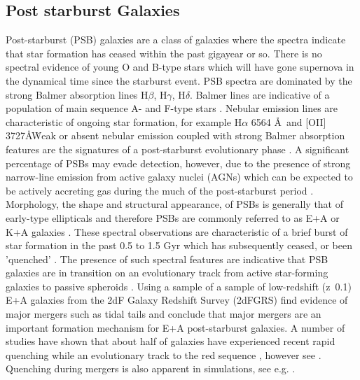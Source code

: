 \subsection{Post starburst Galaxies}
\label{post-starburst-galaxies}
Post-starburst (PSB) galaxies are a class of galaxies where the spectra indicate that star formation has ceased within the past gigayear or so. There is no spectral evidence of young O and B-type stars which will have gone supernova in the dynamical time since the starburst event. PSB spectra are dominated by the strong Balmer absorption lines H$\beta$, H$\gamma$, H$\delta$. Balmer lines are indicative of a population of main sequence A- and F-type stars \citep{1997A&A...325.1025P}. Nebular emission lines are characteristic of ongoing star formation, for example H$\alpha$ 6564 \AA\ and [OII] 3727\AA\. Weak or absent nebular emission coupled with strong Balmer absorption features are the signatures of a post-starburst evolutionary phase \citep{2001ApJ...547L..17B,2003PASJ...55..771G,2004MNRAS.355..713B,2005MNRAS.357..937G,2018MNRAS.477.1708P}. A significant percentage of PSBs may evade detection, however, due to the presence of strong narrow-line emission from active galaxy nuclei (AGNs) which can be expected to be actively accreting gas during the much of the post-starburst period \citep{2018MNRAS.477.1708P}. Morphology, the shape and structural appearance, of PSBs is generally that of early-type ellipticals and therefore PSBs are commonly referred to as E+A or K+A galaxies \citep{1983ApJ...270....7D,1996ApJ...466..104Z,2009ARA&A..47..159B}. These spectral observations are characteristic of a brief burst of star formation in the past 0.5 to 1.5 Gyr which has subsequently ceased, or been 'quenched' \citep{1983ApJ...270....7D,1987MNRAS.229..423C,1997A&A...325.1025P}. The presence of such spectral features are indicative that PSB galaxies are in transition on an evolutionary track from active star-forming galaxies to passive spheroids \citep{2004MNRAS.355..713B,2012MNRAS.420..672S,2013MNRAS.429.2212M}. Using a sample of a sample of low-redshift (z~0.1) E+A galaxies from the 2dF Galaxy Redshift Survey (2dFGRS) \citet{2004MNRAS.355..713B} find evidence of major mergers such as tidal tails and conclude that major mergers are an important formation mechanism for E+A post-starburst galaxies. A number of studies have shown that about half of galaxies have experienced recent rapid quenching while an evolutionary track to the red sequence \citep{Martin_2007,10.1111/j.1365-2966.2009.14537.x,2015MNRAS.450..435S}, however see \cite{2017ApJ...845..145W}. Quenching during mergers is also apparent in simulations, see e.g. \cite{2019MNRAS.484.2447D}.

